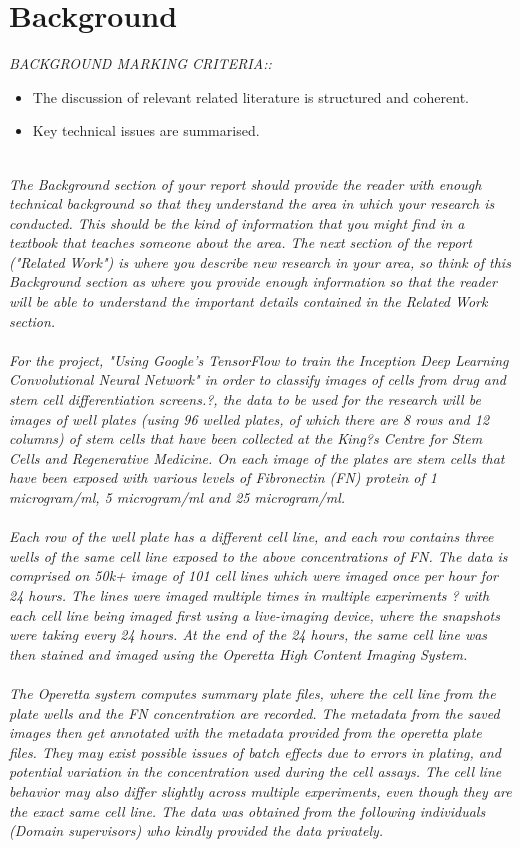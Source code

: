 \section{Background} 
\emph{ BACKGROUND MARKING CRITERIA:: }
\begin{itemize}
\item The discussion of relevant related literature is structured and coherent.
\item Key technical issues are summarised.
\end{itemize}
\emph{ \\ The Background section of your report should provide the reader with enough technical background so that they understand the area in which your research is conducted. This should be the kind of information that you might find in a textbook that teaches someone about the area. The next section of the report ("Related Work") is where you describe new research in your area, so think of this Background section as where you provide enough information so that the reader will be able to understand the important details contained in the Related Work section. \\ \\ 
For the project, "Using Google's TensorFlow to train the Inception Deep Learning Convolutional Neural Network" in order to classify images of cells from drug and stem cell differentiation screens.?, the data to be used for the research will be images of well plates (using 96 welled plates, of which there are 8 rows and 12 columns) of stem cells that have been collected at the King?s Centre for Stem Cells and Regenerative Medicine. On each image of the plates are stem cells that have been exposed with various levels of Fibronectin (FN) protein of 1 microgram/ml, 5 microgram/ml and 25 microgram/ml. \\ \\ 
Each row of the well plate has a different cell line, and each row contains three wells of the same cell line exposed to the above concentrations of FN. The data is comprised on 50k+ image of 101 cell lines which were imaged once per hour for 24 hours. The lines were imaged multiple times in multiple experiments ? with each cell line being imaged first using a live-imaging device, where the snapshots were taking every 24 hours. At the end of the 24 hours, the same cell line was then stained and imaged using the Operetta High Content Imaging System. \\ \\ 
The Operetta system computes summary plate files, where the cell line from the plate wells and the FN concentration are recorded. The metadata from the saved images then get annotated with the metadata provided from the operetta plate files. They may exist possible issues of batch effects due to errors in plating, and potential variation in the concentration used during the cell assays. The cell line behavior may also differ slightly across multiple experiments, even though they are the exact same cell line. The data was obtained from the following individuals (Domain supervisors) who kindly provided the data privately. \\ \\ 
}
